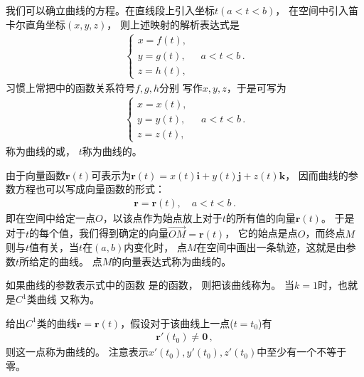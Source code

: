 我们可以确立曲线的方程。在直线段上引入坐标$t(a<t<b)$，
在空间中引入笛卡尔直角坐标$(x,y,z)$，
则上述映射的解析表达式是
\begin{align}\label{eq:03ex01.1}
    \left\{\begin{array}{c}
        x=f(t), \\
        y=g(t), \\
        z=h(t),
    \end{array}
    \right.\quad a<t<b\, .
\end{align}
习惯上常把中的函数关系符号$f,g,h$分别
写作$x,y,z$，于是可写为
\begin{align}\label{eq:03ex01.2}
    \left\{\begin{array}{c}
        x=x(t), \\
        y=y(t), \\
        z=z(t),
    \end{array}
    \right.\quad a<t<b\, .
\end{align}
称为曲线的或，
$t$称为曲线的。

由于向量函数$\bm r(t)$可表示为$\bm r(t)=x(t)\mathbf{i}+y(t)\mathbf{j}+z(t)\mathbf{k}$，
因而曲线的参数方程也可以写成向量函数的形式：
\begin{align}\label{eq:03ex01.3}
    \bm r=\bm r(t),\quad a<t<b\, .
\end{align}
即在空间中给定一点$O$，以该点作为始点放上对于$t$的所有值的向量$\bm r(t)$。
于是对于$t$的每个值，我们得到确定的向量$\overrightarrow{OM}=\bm r(t)$，
它的始点是点$O$，而终点$M$则与$t$值有关，当$t$在$(a,b)$内变化时，
点$M$在空间中画出一条轨迹，这就是由参数$t$所给定的曲线。
点$M$的向量表达式称为曲线的。

\begin{definition}
    如果曲线的参数表示式中的函数
    是的函数，
    则把该曲线称为。
    当$k=1$时，也就是$C^1$类曲线
    又称为。
\end{definition}

\begin{definition}
    给出$C^1$类的曲线$\bm r=\bm r(t)$，假设对于该曲线上一点($t=t_0$)有
    \begin{align}\label{eq:03ex01.4}
        \bm r'(t_0)\neq \bm 0\, ,
    \end{align}
    则这一点称为曲线的。
    注意表示$x'(t_0),y'(t_0),z'(t_0)$中至少有一个不等于零。
\end{definition}

